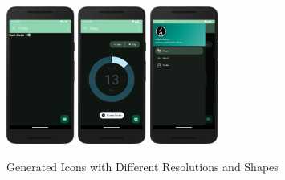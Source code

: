     \begin{figure}[H]
        \centering
        \includegraphics[width=0.20\textwidth]{res/img/darkMode1.png}
        \hspace{0.05\textwidth}
        \includegraphics[width=0.20\textwidth]{res/img/darkMode2.png}      
        \hspace{0.05\textwidth}
        \includegraphics[width=0.20\textwidth]{res/img/darkMode3.png}
        \caption{Generated Icons with Different Resolutions and Shapes}
        \label{fig:ex2_2.4}
    \end{figure}